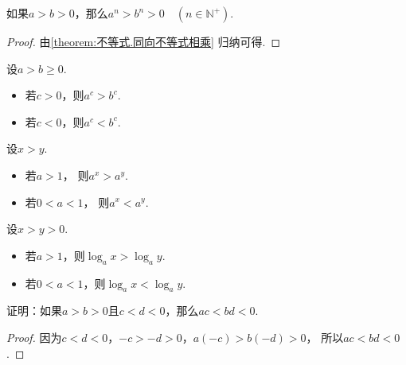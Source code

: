 \begin{corollary}
如果\(a>b>0\)，那么\(a^n>b^n>0 \quad (n\in\mathbb{N}^+)\).
\begin{proof}
由\cref{theorem:不等式.同向不等式相乘} 归纳可得.
\end{proof}
\end{corollary}
\begin{theorem}
设\(a>b\geq0\).
\begin{itemize}
	\item 若\(c>0\)，则\(a^c>b^c\).
	\item 若\(c<0\)，则\(a^c<b^c\).
\end{itemize}
\end{theorem}
\begin{theorem}
设\(x>y\).
\begin{itemize}
	\item 若\(a>1\)，
	则\(a^x>a^y\).
	\item 若\(0<a<1\)，
	则\(a^x<a^y\).
\end{itemize}
\end{theorem}
\begin{theorem}
设\(x>y>0\).
\begin{itemize}
	\item 若\(a>1\)，则\(\log_a x > \log_a y\).
	\item 若\(0<a<1\)，则\(\log_a x < \log_a y\).
\end{itemize}
\end{theorem}

\begin{example}
证明：如果\(a > b > 0\)且\(c < d < 0\)，那么\(ac < bd < 0\).
\begin{proof}
因为\(c < d < 0\)，\(-c > -d > 0\)，\(a(-c) > b(-d) > 0\)，
所以\(ac < bd < 0\).
\end{proof}
\end{example}

